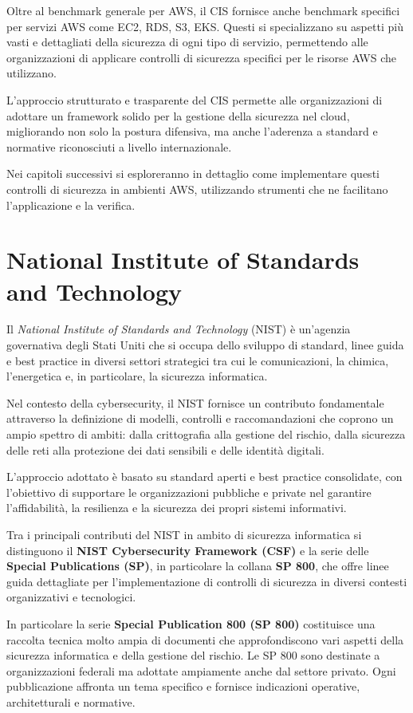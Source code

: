 Oltre al benchmark generale per AWS, il CIS fornisce anche benchmark specifici per servizi AWS come EC2, RDS, S3, EKS. Questi si specializzano su aspetti più vasti e dettagliati della sicurezza di ogni tipo di servizio, permettendo alle organizzazioni di applicare controlli di sicurezza specifici per le risorse AWS che utilizzano. 

L'approccio strutturato e trasparente del CIS permette alle organizzazioni di adottare un framework solido per la gestione della sicurezza nel cloud, migliorando non solo la postura difensiva, ma anche l'aderenza a standard e normative riconosciuti a livello internazionale. 

Nei capitoli successivi si esploreranno in dettaglio come implementare questi controlli di sicurezza in ambienti AWS, utilizzando strumenti che ne facilitano l'applicazione e la verifica.


\section{National Institute of Standards and Technology}
\label{sec:nist}

Il \textit{National Institute of Standards and Technology} (NIST) è un'agenzia governativa degli Stati Uniti che si occupa dello sviluppo di standard, linee guida e best practice in diversi settori strategici tra cui le comunicazioni, la chimica, l'energetica e, in particolare, la sicurezza informatica. 

Nel contesto della cybersecurity, il NIST fornisce un contributo fondamentale attraverso la definizione di modelli, controlli e raccomandazioni che coprono un ampio spettro di ambiti: dalla crittografia alla gestione del rischio, dalla sicurezza delle reti alla protezione dei dati sensibili e delle identità digitali.

L'approccio adottato è basato su standard aperti e best practice consolidate, con l'obiettivo di supportare le organizzazioni pubbliche e private nel garantire l'affidabilità, la resilienza e la sicurezza dei propri sistemi informativi.

Tra i principali contributi del NIST in ambito di sicurezza informatica si distinguono il \textbf{NIST Cybersecurity Framework (CSF)} e la serie delle \textbf{Special Publications (SP)}, in particolare la collana \textbf{SP 800}, che offre linee guida dettagliate per l'implementazione di controlli di sicurezza in diversi contesti organizzativi e tecnologici.

In particolare la serie \textbf{Special Publication 800 (SP 800)} costituisce una raccolta tecnica molto ampia di documenti che approfondiscono vari aspetti della sicurezza informatica e della gestione del rischio. Le SP 800 sono destinate a organizzazioni federali ma adottate ampiamente anche dal settore privato. Ogni pubblicazione affronta un tema specifico e fornisce indicazioni operative, architetturali e normative.

